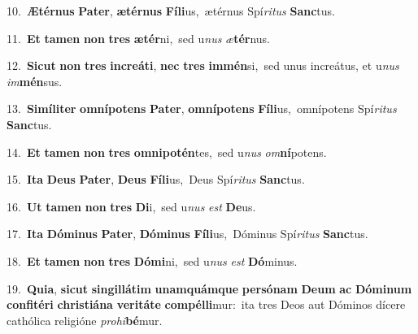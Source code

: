 {{\numbfont\textcolor{\numbcolor}{10.}}~\-\textbf{Æ}\-\textbf{tér}\textbf{nus} \textbf{Pa}\-\textbf{ter}, \textbf{æ}\-\textbf{tér}\textbf{nus} \textbf{Fí}\-\textbf{li}us,~\star ætérnus Spí\-\textit{ri}\-\textit{tus} \textbf{Sanc}\-tus.\par
{\numbfont\textcolor{\numbcolor}{11.}}~\textbf{Et} \textbf{ta}\-\textbf{men} \textbf{non} \textbf{tres} \textbf{æ}\-\textbf{tér}ni,~\star sed u\textit{nus} \textit{æ}\-\textbf{tér}nus.\par
{\numbfont\textcolor{\numbcolor}{12.}}~\-\textbf{Sic}\-\textbf{ut} \textbf{non} \textbf{tres} \textbf{in}\-\textbf{cre}\textbf{á}\textbf{ti}, \textbf{nec} \textbf{tres} \textbf{im}\-\textbf{mén}si,~\star sed unus increátus, et u\textit{nus} \textit{im}\-\textbf{mén}sus.\par
{\numbfont\textcolor{\numbcolor}{13.}}~\-\textbf{Si}\-\textbf{mí}\textbf{li}\textbf{ter} \textbf{om}\-\textbf{ní}\textbf{pot}\textbf{ens} \textbf{Pa}\-\textbf{ter}, \textbf{om}\-\textbf{ní}\textbf{pot}\textbf{ens} \textbf{Fí}\-\textbf{li}us,~\star omnípotens Spí\-\textit{ri}\-\textit{tus} \textbf{Sanc}\-tus.\par
{\numbfont\textcolor{\numbcolor}{14.}}~\textbf{Et} \textbf{ta}\-\textbf{men} \textbf{non} \textbf{tres} \textbf{om}\-\textbf{ni}\textbf{pot}\textbf{én}tes,~\star sed u\textit{nus} \textit{om}\-\textbf{ní}potens.\par
{\numbfont\textcolor{\numbcolor}{15.}}~\-\textbf{I}\-\textbf{ta} \textbf{De}\-\textbf{us} \textbf{Pa}\-\textbf{ter}, \textbf{De}\-\textbf{us} \textbf{Fí}\-\textbf{li}us,~\star Deus Spí\-\textit{ri}\-\textit{tus} \textbf{Sanc}\-tus.\par
{\numbfont\textcolor{\numbcolor}{16.}}~\textbf{Ut} \textbf{ta}\-\textbf{men} \textbf{non} \textbf{tres} \textbf{Di}\-i,~\star sed u\textit{nus} \textit{est} \textbf{De}\-us.\par
{\numbfont\textcolor{\numbcolor}{17.}}~\-\textbf{I}\-\textbf{ta} \textbf{Dó}\-\textbf{mi}\textbf{nus} \textbf{Pa}\-\textbf{ter}, \textbf{Dó}\-\textbf{mi}\textbf{nus} \textbf{Fí}\-\textbf{li}us,~\star Dóminus Spí\-\textit{ri}\-\textit{tus} \textbf{Sanc}\-tus.\par
{\numbfont\textcolor{\numbcolor}{18.}}~\textbf{Et} \textbf{ta}\-\textbf{men} \textbf{non} \textbf{tres} \textbf{Dó}\-\textbf{mi}ni,~\star sed u\textit{nus} \textit{est} \textbf{Dó}\-minus.\par
{\numbfont\textcolor{\numbcolor}{19.}}~\-\textbf{Qui}\-\textbf{a}, \textbf{sic}\-\textbf{ut} \textbf{sin}\-\textbf{gil}\textbf{lá}\textbf{tim} \textbf{u}\-\textbf{nam}\textbf{quám}\textbf{que} \textbf{per}\-\textbf{só}\textbf{nam} \textbf{De}\-\textbf{um} \textbf{ac} \textbf{Dó}\-\textbf{mi}\textbf{num} \textbf{con}\-\textbf{fi}\textbf{té}\textbf{ri} \textbf{chris}\-\textbf{ti}\textbf{á}\textbf{na} \textbf{ve}\-\textbf{ri}\textbf{tá}\textbf{te} \textbf{com}\-\textbf{pél}\textbf{li}mur:~\star ita tres Deos aut Dóminos dícere cathólica religióne \textit{pro}\-\textit{hi}\textbf{bé}mur.\par
}
